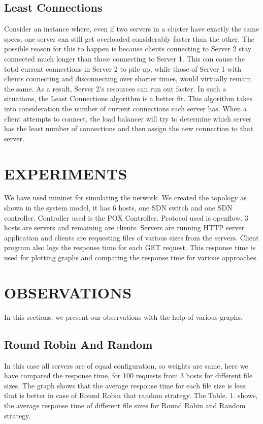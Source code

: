 \documentclass[letterpaper, 10 pt, conference]{IEEEtran}
\begin{document}
\subsection{Least Connections}

Consider an instance where, even if two servers in a cluster have exactly the same specs, one server can still get overloaded considerably faster than the other. The possible reason for this to happen is because clients connecting to Server 2 stay connected much longer than those connecting to Server 1. This can cause the total current connections in Server 2 to pile up, while those of Server 1 with clients connecting and disconnecting over shorter times, would virtually remain the same. As a result, Server 2's resources can run out faster.  
In such a situations, the Least Connections algorithm is a better fit. This algorithm takes into consideration the number of current connections each server has. When a client attempts to connect, the load balancer will try to determine which server has the least number of connections and then assign the new connection to that server.

\section{EXPERIMENTS}
\label{sec:EXPERIMENTS}

We have used mininet for simulating the network. We created the topology as shown in the system model, it has 6 hosts, one SDN switch and one SDN  controller. Controller used is the POX Controller. Protocol used is openflow. 3 hosts are servers and remaining are clients. Servers are running HTTP server application and clients are requesting files of various sizes from the servers.  
Client program also logs the response time for each GET request. This response time is used for plotting graphs and comparing the response time for various approaches.


\section{OBSERVATIONS}
\label{sec:OBSERVATIONS}
In this sections, we present our observations with the help of various graphs.

\subsection{Round Robin And Random}
In this case all servers are of equal configuration, so weights are same, here we have compared the response time, for 100 requests from 3 hosts for different file sizes. The graph shows that the average response time for  each file size is less that is better in case of Round Robin that random strategy. 
The Table. 1.  shows, the average response time of different file sizes for Round Robin and Random strategy.
\end{document}
